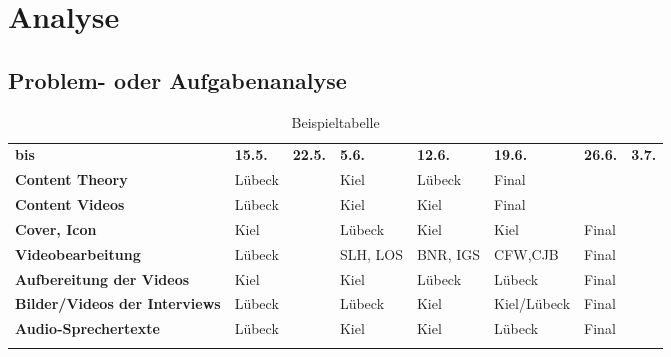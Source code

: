 \chapter{Analyse}\label{chapter:analysis}


\section{Problem- oder Aufgabenanalyse}\label{sec:problem_ana}


\begin{table}[ht]
  \begin{tabularx}{\columnwidth}{!{\vrule width 1pt}Y!{\vrule width 1pt}l|l|l|l|l|l|l!{\vrule width 1pt}}
    \textbf{bis} & \textbf{15.5.} & \textbf{22.5.} & \textbf{5.6.} & \textbf{12.6.} & \textbf{19.6.} & \textbf{26.6.} & \textbf{3.7.} \\
    \textbf{Content Theory}  & Lübeck & & Kiel     & Lübeck   & Final        &       & \\\hline
    \textbf{Content Videos}  & Lübeck & & Kiel     & Kiel     & Final        &       & \\\hline
    \textbf{Cover, Icon}     & Kiel   & & Lübeck   & Kiel     & Kiel         & Final & \\\hline
    \textbf{Videobearbeitung}& Lübeck & & SLH, LOS & BNR, IGS & CFW,CJB      & Final & \\\hline
    \textbf{Aufbereitung der Videos}
                             & Kiel   & & Kiel     & Lübeck   & Lübeck       & Final & \\\hline
    \textbf{Bilder/Videos der Interviews}
                             & Lübeck & & Lübeck   & Kiel     & Kiel/Lübeck  & Final & \\\hline
    \textbf{Audio-Sprechertexte}
                             & Lübeck & & Kiel     & Kiel     & Lübeck       & Final & \\
  \end{tabularx}
  \caption{Beispieltabelle}
  \label{table:example}
\end{table}%

